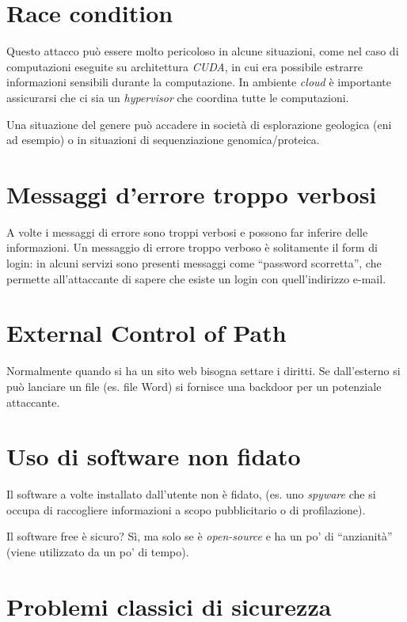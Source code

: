\section{Race condition}

Questo attacco può essere molto pericoloso in alcune situazioni, come nel caso 
di computazioni eseguite su architettura \textit{CUDA}, in cui era 
possibile estrarre informazioni sensibili durante la computazione. In ambiente 
\textit{cloud} è importante assicurarsi che ci sia un \textit{hypervisor} che 
coordina tutte le computazioni.

Una situazione del genere può accadere in società di esplorazione geologica (eni 
ad esempio) o in situazioni di sequenziazione genomica/proteica.

\section{Messaggi d'errore troppo verbosi}

A volte i messaggi di errore sono troppi verbosi e possono far inferire delle 
informazioni. Un messaggio di errore troppo verboso è solitamente il form di 
login: in alcuni servizi sono presenti messaggi come ``password scorretta'', che 
permette all'attaccante di sapere che esiste un login con quell'indirizzo 
e-mail.

\section{External Control of Path}

Normalmente quando si ha un sito web bisogna settare i diritti. Se dall'esterno 
si può lanciare un file (es. file Word) si fornisce una backdoor per un 
potenziale attaccante.

\section{Uso di software non fidato}

Il software a volte installato dall'utente non è fidato, (es. uno 
\textit{spyware} che si occupa di raccogliere informazioni a scopo pubblicitario 
o di profilazione).

Il software free è sicuro? Sì, ma solo se è \textit{open-source} e ha un po' di 
``anzianità'' (viene utilizzato da un po' di tempo).

\section{Problemi classici di sicurezza}

